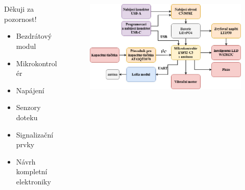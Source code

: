 \documentclass[%
  12pt,       				%
	t,                  %
	aspectratio=1610,   %
	unicode,						%
]{beamer}				    	%
\begin{document}
\begin{frame}[c] 
	\frametitle{\mbox{ }}
	\begin{center}
		\begin{columns}[T] 								%
			\begin{column}{0.3\textwidth}		%
				{\Huge Děkuji za pozornost!}
				\vspace{1cm}
				\begin{itemize}
					\item Bezdrátový modul
					\item Mikrokontrolér
					\item Napájení 
					\item Senzory doteku
					\item Signalizační prvky 
					\item Návrh kompletní elektroniky
				\end{itemize}
			\end{column}
			\begin{column}{0.7\textwidth}		%
				\begin{figure}
					\centering
					\vspace{0.5cm}
					\includegraphics[width=0.9\columnwidth]{obrazky/vysledne_blokove_schema_prezentace.jpg}
				\end{figure}
			\end{column}
		\end{columns}	
	\end{center}
\end{frame}

\end{document}
